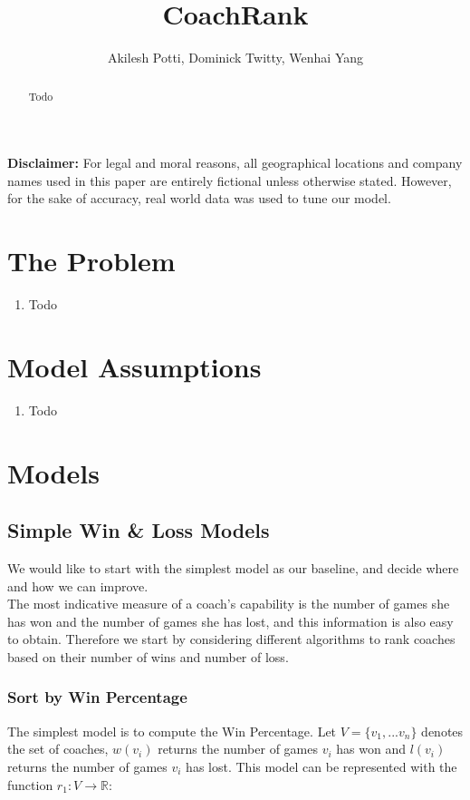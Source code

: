 \documentclass[titlepage]{article}
\begin{document}
\title{CoachRank}
\author{Akilesh Potti, Dominick Twitty, Wenhai Yang}
\maketitle

\begin{abstract}
Todo
\end{abstract}



\noindent\textbf{Disclaimer:} For legal and moral reasons, all geographical locations and company names used in this paper are entirely fictional unless otherwise stated. However, for the sake of accuracy, real world data was used to tune our model.


\section{The Problem}
\begin{enumerate}
\item Todo
\end{enumerate}


\section{Model Assumptions}
\begin{enumerate}
\item Todo
\end{enumerate}

\section{Models}

\subsection{Simple Win \& Loss Models}

We would like to start with the simplest model as our baseline, and decide where and how we can improve.
\\

\noindent The most indicative measure of a coach's capability is the number of games she has won and the number of games she has lost, and this information is also easy to obtain. Therefore we start by considering different algorithms to rank coaches based on their number of wins and number of loss.

\subsubsection{Sort by Win Percentage}
The simplest model is to compute the Win Percentage. Let $V = \{v_1, ... v_n\}$ denotes the set of coaches, $w(v_i)$ returns the number of games $v_i$ has won and $l(v_i)$ returns the number of games $v_i$ has lost. This model can be represented with the function $r_1: V \rightarrow \mathbb{R}$:
\end{document}
